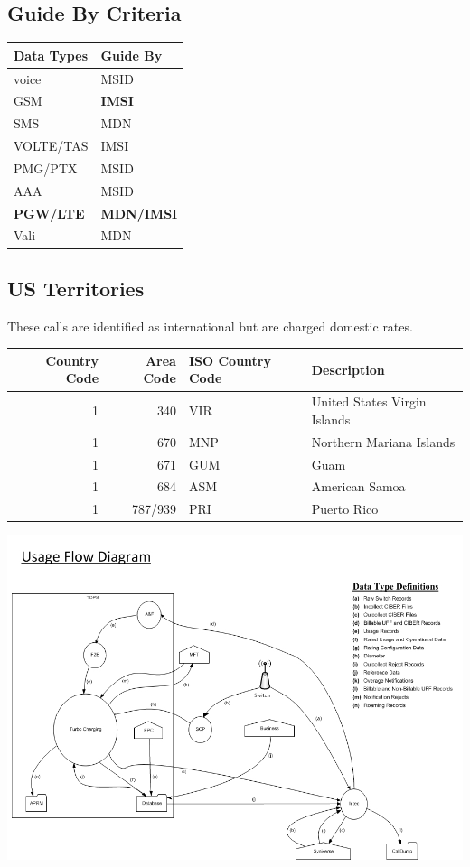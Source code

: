 \documentclass[12pt,twoside]{article}
\begin{document}
\normalsize
\subsection{Guide By Criteria}
\label{sec:orgheadline21}

\begin{center}
\begin{tabular}{ll}
\hline
\textbf{Data Types} & \textbf{Guide By}\\
\hline
voice & MSID\\
GSM & \textbf{IMSI}\\
SMS & MDN\\
VOLTE/TAS & IMSI\\
PMG/PTX & MSID\\
AAA & MSID\\
\textbf{PGW/LTE} & \textbf{MDN/IMSI}\\
Vali & MDN\\
\hline
\end{tabular}
\end{center}

\subsection{US Territories}
\label{sec:orgheadline22}
These calls are identified as international but are charged
domestic rates.
\begin{center}
\begin{tabular}{rrll}
\hline
Country Code & Area Code & ISO Country Code & Description\\
\hline
1 & 340 & VIR & United States Virgin Islands\\
1 & 670 & MNP & Northern Mariana Islands\\
1 & 671 & GUM & Guam\\
1 & 684 & ASM & American Samoa\\
1 & 787/939 & PRI & Puerto Rico\\
\hline
\end{tabular}
\end{center}

\newpage 
\begin{landscape}  
\includegraphics[width=.9\linewidth]{Pictures/usage_flow.jpg}


\end{landscape} 
\newpage
\end{document}
